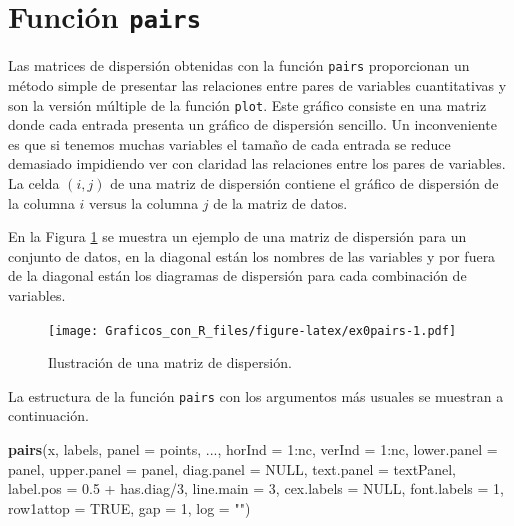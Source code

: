\documentclass[10pt,]{krantz}
\makeatletter
\newenvironment{Shaded}{\begin{snugshade}}{\end{snugshade}}
\newcommand{\KeywordTok}[1]{\textcolor[rgb]{0.13,0.29,0.53}{\textbf{{#1}}}}
\newcommand{\DataTypeTok}[1]{\textcolor[rgb]{0.13,0.29,0.53}{{#1}}}
\newcommand{\DecValTok}[1]{\textcolor[rgb]{0.00,0.00,0.81}{{#1}}}
\newcommand{\FloatTok}[1]{\textcolor[rgb]{0.00,0.00,0.81}{{#1}}}
\newcommand{\StringTok}[1]{\textcolor[rgb]{0.31,0.60,0.02}{{#1}}}
\newcommand{\OtherTok}[1]{\textcolor[rgb]{0.56,0.35,0.01}{{#1}}}
\newcommand{\NormalTok}[1]{{#1}}
\newenvironment{kframe}{%
\medskip{}
\setlength{\fboxsep}{.8em}
 \def\at@end@of@kframe{}%
 \ifinner\ifhmode%
  \def\at@end@of@kframe{\end{minipage}}%
  \begin{minipage}{\columnwidth}%
 \fi\fi%
 \def\FrameCommand##1{\hskip\@totalleftmargin \hskip-\fboxsep
 \colorbox{shadecolor}{##1}\hskip-\fboxsep
     \hskip-\linewidth \hskip-\@totalleftmargin \hskip\columnwidth}%
 \MakeFramed {\advance\hsize-\width
   \@totalleftmargin\z@ \linewidth\hsize
   \@setminipage}}%
 {\par\unskip\endMakeFramed%
 \at@end@of@kframe}
\renewenvironment{Shaded}{\begin{kframe}}{\end{kframe}}
\makeatother
\begin{document}
\section{\texorpdfstring{Función \texttt{pairs}
}{Función pairs }}\label{funcion-pairs}

Las matrices de dispersión obtenidas con la función \texttt{pairs}
proporcionan un método simple de presentar las relaciones entre pares de
variables cuantitativas y son la versión múltiple de la función
\texttt{plot}. Este gráfico consiste en una matriz donde cada entrada
presenta un gráfico de dispersión sencillo. Un inconveniente es que si
tenemos muchas variables el tamaño de cada entrada se reduce demasiado
impidiendo ver con claridad las relaciones entre los pares de variables.
La celda \((i,j)\) de una matriz de dispersión contiene el gráfico de
dispersión de la columna \(i\) versus la columna \(j\) de la matriz de
datos.

En la Figura \ref{fig:ex0pairs} se muestra un ejemplo de una matriz de
dispersión para un conjunto de datos, en la diagonal están los nombres
de las variables y por fuera de la diagonal están los diagramas de
dispersión para cada combinación de variables.

\begin{figure}[htbp]
\centering
\texttt{[image: Graficos\_con\_R\_files/figure-latex/ex0pairs-1.pdf]}
\caption{\label{fig:ex0pairs}Ilustración de una matriz de dispersión.}
\end{figure}

La estructura de la función \texttt{pairs} con los argumentos más
usuales se muestran a continuación.

\begin{Shaded}
\begin{Highlighting}[]
\KeywordTok{pairs}\NormalTok{(x, labels, }\DataTypeTok{panel =} \NormalTok{points, ...,}
      \DataTypeTok{horInd =} \DecValTok{1}\NormalTok{:nc, }\DataTypeTok{verInd =} \DecValTok{1}\NormalTok{:nc,}
      \DataTypeTok{lower.panel =} \NormalTok{panel, }\DataTypeTok{upper.panel =} \NormalTok{panel,}
      \DataTypeTok{diag.panel =} \OtherTok{NULL}\NormalTok{, }\DataTypeTok{text.panel =} \NormalTok{textPanel,}
      \DataTypeTok{label.pos =} \FloatTok{0.5} \NormalTok{+}\StringTok{ }\NormalTok{has.diag/}\DecValTok{3}\NormalTok{, }\DataTypeTok{line.main =} \DecValTok{3}\NormalTok{,}
      \DataTypeTok{cex.labels =} \OtherTok{NULL}\NormalTok{, }\DataTypeTok{font.labels =} \DecValTok{1}\NormalTok{,}
      \DataTypeTok{row1attop =} \OtherTok{TRUE}\NormalTok{, }\DataTypeTok{gap =} \DecValTok{1}\NormalTok{, }\DataTypeTok{log =} \StringTok{""}\NormalTok{)}
\end{Highlighting}
\end{Shaded}
\end{document}
